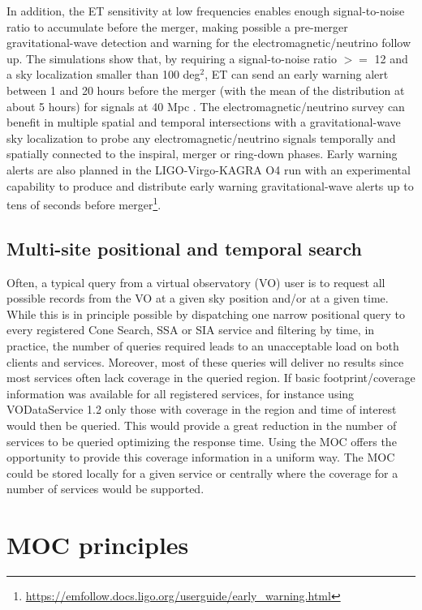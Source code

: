 \documentclass[11pt,a4paper]{ivoa}
\begin{document}
In addition, the ET sensitivity at low frequencies enables enough
signal-to-noise ratio to accumulate before the merger, making possible
a pre-merger gravitational-wave detection and warning for the
electromagnetic/neutrino follow up.  The simulations show that, by
requiring a signal-to-noise ratio $>=$ 12 and a sky localization smaller
than 100 deg$^2$, ET can send an early warning alert between 1 and 20 hours
before the merger (with the mean of the distribution at about 5 hours)
for signals at 40 Mpc \citep{2018PhRvD..97l3014C}. The
electromagnetic/neutrino survey can benefit
in multiple spatial and temporal intersections with a gravitational-wave
sky localization to probe any electromagnetic/neutrino signals temporally
and spatially connected to the inspiral, merger or ring-down phases.
Early warning alerts are also planned in the LIGO-Virgo-KAGRA O4 run with
an experimental capability to produce and distribute early warning
gravitational-wave alerts up to tens of seconds before
merger\footnote{\url{https://emfollow.docs.ligo.org/userguide/early_warning.html}}.  


\subsection{Multi-site positional and temporal search}
Often, a typical query from a virtual observatory (VO) user is to
request all possible records from the VO at a given sky position
and/or at a given time. While this is in principle possible by
dispatching one narrow positional query to every registered Cone
Search, SSA or SIA service and filtering by time, in practice, the
number of queries required leads to an unacceptable load on both
clients and services. Moreover, most of these queries will deliver no
results since most services often lack coverage in the queried
region. If basic footprint/coverage information was available for all
registered services, for instance using VODataService 1.2
\citep{2021ivoa.spec.1102D} only those with coverage in the region
and time of interest would then be queried. This would provide a great
reduction in the number of services to be queried optimizing the
response time. Using the MOC offers the opportunity to provide this
coverage information in a uniform way. The MOC could be stored locally
for a given service or centrally where the coverage for a number of
services would be supported.


\section{MOC principles}
\end{document}
